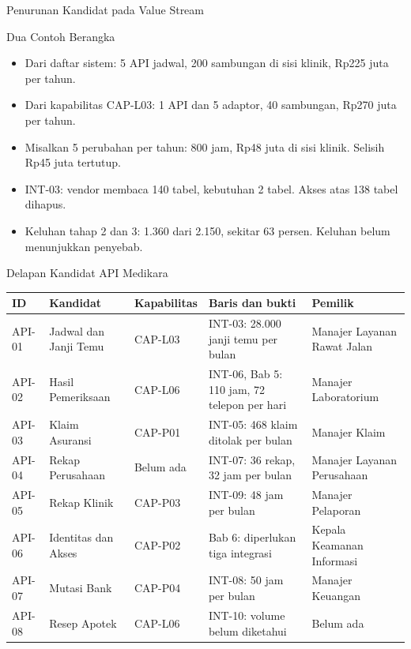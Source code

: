 \documentclass[aspectratio=169, table, 12pt]{beamer}
\begin{document}
\begin{frame}{{\Large Penurunan Kandidat pada Value Stream}}
  \centering
\end{frame}

\begin{frame}{{\Large Dua Contoh Berangka}}
  \vspace{8pt}
  \begin{itemize}
    \item Dari daftar sistem: 5 API jadwal, 200 sambungan di sisi klinik, Rp225 juta per tahun.
    \item Dari kapabilitas CAP-L03: 1 API dan 5 adaptor, 40 sambungan, Rp270 juta per tahun.
    \item Misalkan 5 perubahan per tahun: 800 jam, Rp48 juta di sisi klinik. Selisih Rp45 juta tertutup.
    \item INT-03: vendor membaca 140 tabel, kebutuhan 2 tabel. Akses atas 138 tabel dihapus.
    \item Keluhan tahap 2 dan 3: 1.360 dari 2.150, sekitar 63 persen. Keluhan belum menunjukkan penyebab.
  \end{itemize}
\end{frame}

\begin{frame}{{\Large Delapan Kandidat API Medikara}}
  \scriptsize
  \begin{tabularx}{\textwidth}{>{\raggedright\arraybackslash}p{1.15cm} >{\raggedright\arraybackslash}p{3.1cm}
      >{\raggedright\arraybackslash}p{1.55cm} >{\raggedright\arraybackslash}X >{\raggedright\arraybackslash}p{3.3cm}}
    \hline
    \textbf{ID} & \textbf{Kandidat} & \textbf{Kapabilitas} & \textbf{Baris dan bukti} & \textbf{Pemilik} \\ \hline
    API-01 & Jadwal dan Janji Temu & CAP-L03 & INT-03: 28.000 janji temu per bulan & Manajer Layanan Rawat Jalan \\ \hline
    API-02 & Hasil Pemeriksaan & CAP-L06 & INT-06, Bab 5: 110 jam, 72 telepon per hari & Manajer Laboratorium \\ \hline
    API-03 & Klaim Asuransi & CAP-P01 & INT-05: 468 klaim ditolak per bulan & Manajer Klaim \\ \hline
    API-04 & Rekap Perusahaan & Belum ada & INT-07: 36 rekap, 32 jam per bulan & Manajer Layanan Perusahaan \\ \hline
    API-05 & Rekap Klinik & CAP-P03 & INT-09: 48 jam per bulan & Manajer Pelaporan \\ \hline
    API-06 & Identitas dan Akses & CAP-P02 & Bab 6: diperlukan tiga integrasi & Kepala Keamanan Informasi \\ \hline
    API-07 & Mutasi Bank & CAP-P04 & INT-08: 50 jam per bulan & Manajer Keuangan \\ \hline
    API-08 & Resep Apotek & CAP-L06 & INT-10: volume belum diketahui & Belum ada \\ \hline
  \end{tabularx}
\end{frame}
\end{document}
